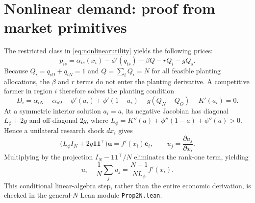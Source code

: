 \documentclass[11pt]{article}
\begin{document}
\section{Nonlinear demand: proof from market primitives}
\label{app:nonlinearproof}
The restricted class in \eqref{eq:nonlinearutility} yields the following prices:
\begin{equation}
 p_{is}=\alpha_{is}(x_i)-\phi'(q_{is})-\beta Q-rQ_i-gQ_s.
 \label{eq:appprice}
\end{equation}
Because $Q_i=q_{iO}+q_{iN}=1$ and $Q=\sum_i Q_i=N$ for all feasible planting allocations, the $\beta$ and $r$ terms do not enter the planting derivative. A competitive farmer in region $i$ therefore solves the planting condition
\begin{equation}
D_i=\alpha_{iN}-\alpha_{iO}
 -\phi'(a_i)+\phi'(1-a_i)
 -g(Q_N-Q_O)-K'(a_i)=0.
\label{eq:appD}
\end{equation}
At a symmetric interior solution $a_i=a$, its negative Jacobian has diagonal $L_\phi+2g$ and off-diagonal $2g$, where $L_\phi=K''(a)+\phi''(1-a)+\phi''(a)>0$. Hence a unilateral research shock $dx_i$ gives
\begin{equation}
 \big(L_\phi I_N+2g\mathbf1\mathbf1^\top\big)\mathbf u
 =f'(x_i)\mathbf e_i,\qquad
 u_j=\frac{\partial a_j}{\partial x_i}.
 \label{eq:appJ}
\end{equation}
Multiplying by the projection $I_N-\mathbf1\mathbf1^\top/N$ eliminates the rank-one term, yielding
\begin{equation}
u_i-\frac1N\sum_j u_j
=\frac{N-1}{NL_\phi}f'(x_i).
\label{eq:appcontrast}
\end{equation}
This conditional linear-algebra step, rather than the entire economic derivation, is checked in the general-$N$ Lean module \texttt{Prop2N.lean}.
\end{document}

